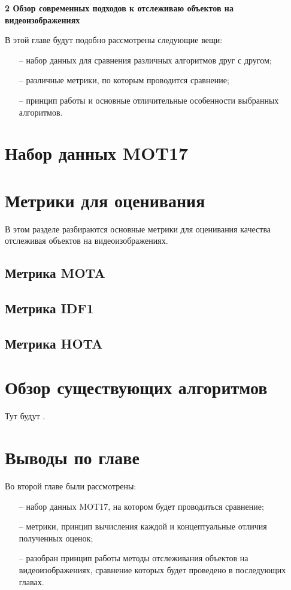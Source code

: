 \newpage
\begin{flushleft}
  \textbf{\large 2 Обзор современных подходов к отслеживаю объектов на видеоизображениях}
\end{flushleft}
В этой главе будут подобно рассмотрены следующие вещи:
\begin{itemize}
  \item[--] набор данных для сравнения различных алгоритмов друг с другом;
  \item[--] различные метрики, по которым проводится сравнение;
  \item[--] принцип работы и основные отличительные особенности выбранных алгоритмов. 
\end{itemize}
\section{Набор данных MOT17}

\section{Метрики для оценивания}
В этом разделе разбираются основные метрики для оценивания качества отслеживая объектов на видеоизображениях.
\subsection{Метрика MOTA}

\subsection{Метрика IDF1}

\subsection{Метрика HOTA}


\section{Обзор существующих алгоритмов }
Тут будут \cite{aharon2022bot, cao2023observation, du2023strongsort, maggiolino2023deep, stadler2023improved, zhang2022bytetrack}.

\section{Выводы по главе}
Во второй главе были рассмотрены:
\begin{itemize}
  \item[--] набор данных MOT17, на котором будет проводиться сравнение;
  \item[--] метрики, принцип вычисления каждой и концептуальные отличия полученных оценок;
  \item[--] разобран принцип работы методы отслеживания объектов на видеоизображениях, сравнение которых будет проведено в последующих главах.  
\end{itemize}
